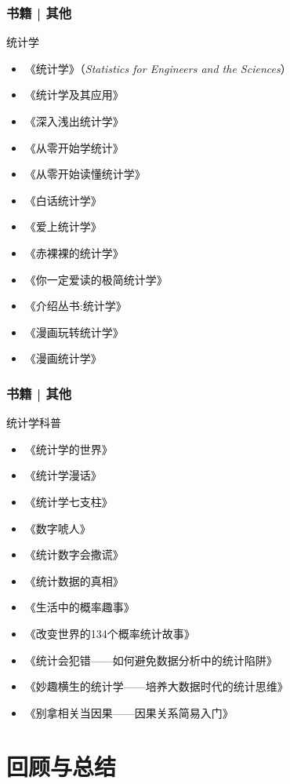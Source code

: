 \begin{frame}
  \frametitle{书籍 | 其他}
    \begin{block}{统计学}
    \begin{itemize}
      \item 《统计学》（\textit{Statistics for Engineers and the Sciences}）
      \item 《统计学及其应用》
      \item 《深入浅出统计学》
      \item 《从零开始学统计》
      \item 《从零开始读懂统计学》
      \item 《白话统计学》
      \item 《爱上统计学》
      \item 《赤裸裸的统计学》
      \item 《你一定爱读的极简统计学》
      \item 《介绍丛书:统计学》
      \item 《漫画玩转统计学》
      \item 《漫画统计学》
    \end{itemize}
  \end{block}
\end{frame}

\begin{frame}
  \frametitle{书籍 | 其他}
    \begin{block}{统计学科普}
      \begin{itemize}
      \item 《统计学的世界》
      \item 《统计学漫话》
      \item 《统计学七支柱》
      \item 《数字唬人》
      \item 《统计数字会撒谎》
      \item 《统计数据的真相》
      \item 《生活中的概率趣事》
      \item 《改变世界的134个概率统计故事》
      \item 《统计会犯错——如何避免数据分析中的统计陷阱》
      \item 《妙趣横生的统计学——培养大数据时代的统计思维》
      \item 《别拿相关当因果——因果关系简易入门》
      \end{itemize}
    \end{block}
\end{frame}

\section{回顾与总结}
